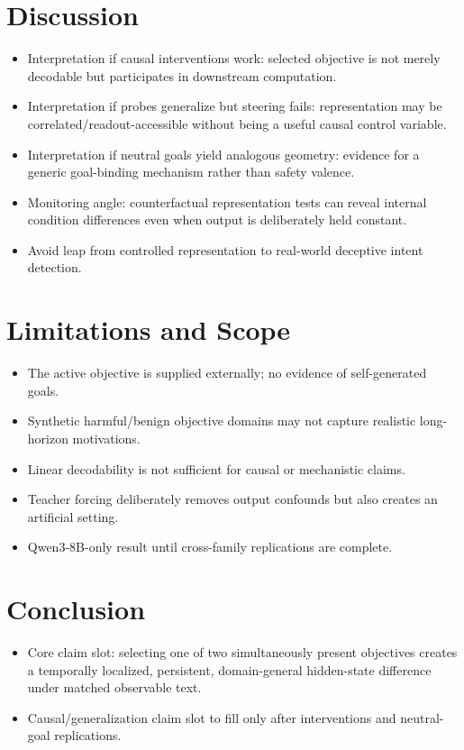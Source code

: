 \documentclass[10pt]{article}
\newcommand{\paperidea}[1]{\item #1}
\begin{document}
\section{Discussion}
\begin{itemize}
  \paperidea{Interpretation if causal interventions work: selected objective is not merely decodable but participates in downstream computation.}
  \paperidea{Interpretation if probes generalize but steering fails: representation may be correlated/readout-accessible without being a useful causal control variable.}
  \paperidea{Interpretation if neutral goals yield analogous geometry: evidence for a generic goal-binding mechanism rather than safety valence.}
  \paperidea{Monitoring angle: counterfactual representation tests can reveal internal condition differences even when output is deliberately held constant.}
  \paperidea{Avoid leap from controlled representation to real-world deceptive intent detection.}
\end{itemize}

\section{Limitations and Scope}
\begin{itemize}
  \paperidea{The active objective is supplied externally; no evidence of self-generated goals.}
  \paperidea{Synthetic harmful/benign objective domains may not capture realistic long-horizon motivations.}
  \paperidea{Linear decodability is not sufficient for causal or mechanistic claims.}
  \paperidea{Teacher forcing deliberately removes output confounds but also creates an artificial setting.}
  \paperidea{Qwen3-8B-only result until cross-family replications are complete.}
\end{itemize}

\section{Conclusion}
\begin{itemize}
  \paperidea{Core claim slot: selecting one of two simultaneously present objectives creates a temporally localized, persistent, domain-general hidden-state difference under matched observable text.}
  \paperidea{Causal/generalization claim slot to fill only after interventions and neutral-goal replications.}
\end{itemize}



\end{document}
